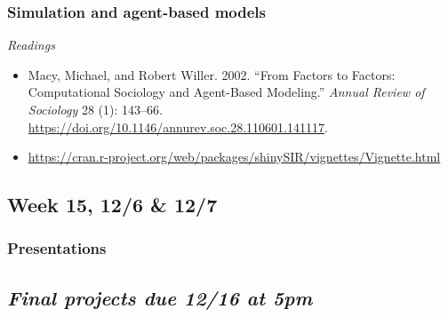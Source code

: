 \documentclass[
  10pt,
]{article}
\providecommand{\tightlist}{%
  \setlength{\itemsep}{0pt}\setlength{\parskip}{0pt}}
\begin{document}
\hypertarget{simulation-and-agent-based-models}{%
\subsubsection{Simulation and agent-based
models}\label{simulation-and-agent-based-models}}

\emph{Readings}

\begin{itemize}
\tightlist
\item
  Macy, Michael, and Robert Willer. 2002. ``From Factors to Factors:
  Computational Sociology and Agent-Based Modeling.'' \emph{Annual
  Review of Sociology} 28 (1): 143--66.
  \url{https://doi.org/10.1146/annurev.soc.28.110601.141117}.
\item
  \url{https://cran.r-project.org/web/packages/shinySIR/vignettes/Vignette.html}
\end{itemize}

\hypertarget{week-15-126-127}{%
\subsection{Week 15, 12/6 \& 12/7}\label{week-15-126-127}}

\hypertarget{presentations}{%
\subsubsection{Presentations}\label{presentations}}

\hypertarget{final-projects-due-1216-at-5pm}{%
\subsection{\texorpdfstring{\emph{Final projects due 12/16 at
5pm}}{Final projects due 12/16 at 5pm}}\label{final-projects-due-1216-at-5pm}}
\end{document}
